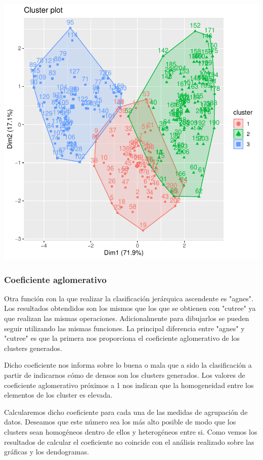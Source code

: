 \documentclass [a4paper] {article}
\begin{document}
\begin{center}
\begin{Schunk}
\begin{Sinput}
\end{Sinput}
\end{Schunk}
\includegraphics{entrega-jerarquica_acendente_ward_plot}
\end{center}

\subsubsection{Coeficiente aglomerativo}
Otra función con la que realizar la clasificación jerárquica ascendente es "agnes".
Los resultados obtendidos son los mismos que los que se obtienen con "cutree" ya que realizan las mismas operaciones.
Adicionalmente para dibujarlos se pueden seguir utilizando las mismas funciones.
La principal diferencia entre "agnes" y "cutree" es que la primera nos proporciona el coeficiente aglomerativo de los clusters generados.

Dicho coeficiente nos informa sobre lo buena o mala que a sido la clasificación a partir de indicarnos cómo de densos son los clusters generados.
Los valores de coeficiente aglomerativo próximos a 1 nos indican que la homogeneidad entre los elementos de los cluster es elevada.

Calcularemos dicho coeficiente para cada una de las medidas de agrupación de datos.
Deseamos que este número sea los más alto posible de modo que los clusters sean homogéneos dentro de ellos y heterogéneos entre si.
Como vemos los resultados de calcular el coeficiente no coincide con el análisis realizado sobre las gráficas y los dendogramas.
\end{document}
